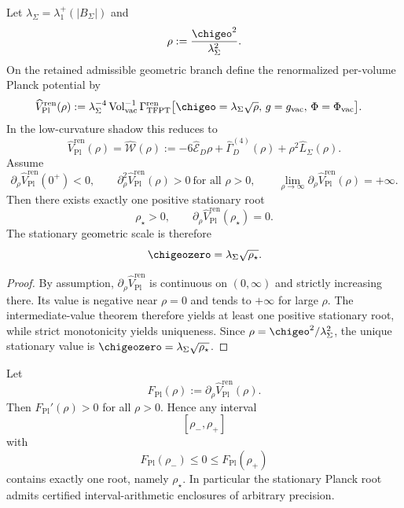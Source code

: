 \begin{theorem}
\label{thm:absolute-spectral-planck-closure}
\label{thm:stationary_geometric_scale_equation}
Let $\lambda_\Sigma=\lambda_1^+(|B_\Sigma|)$ and
\[
\rho:=\frac{\chigeo^2}{\lambda_\Sigma^2}.
\]
On the retained admissible geometric branch define the renormalized per-volume Planck potential by
\[
\begin{aligned}
\widehat V_{\mathrm{Pl}}^{\mathrm{ren}}(\rho)
&:=
\lambda_\Sigma^{-4}\operatorname{Vol}_{\mathrm{vac}}^{-1}
\Gamma_{\mathrm{TFPT}}^{\mathrm{ren}}
\bigl[\chigeo=\lambda_\Sigma\sqrt{\rho},\,g=g_{\mathrm{vac}},\,\Phi=\Phi_{\mathrm{vac}}\bigr].
\end{aligned}
\]
In the low-curvature shadow this reduces to
\[
\widehat V_{\mathrm{Pl}}^{\mathrm{ren}}(\rho)=\widehat{\mathcal W}(\rho)
:=
-6\widehat{\mathcal E}_D\rho
+
\widehat\Gamma_D^{(4)}(\rho)
+
\rho^2\widehat L_\Sigma(\rho).
\]
Assume
\[
\partial_\rho\widehat V_{\mathrm{Pl}}^{\mathrm{ren}}(0^+)<0,
\qquad
\partial_\rho^2\widehat V_{\mathrm{Pl}}^{\mathrm{ren}}(\rho)>0\ \text{for all }\rho>0,
\qquad
\lim_{\rho\to\infty}\partial_\rho\widehat V_{\mathrm{Pl}}^{\mathrm{ren}}(\rho)=+\infty.
\]
Then there exists exactly one positive stationary root
\[
\rho_\star>0,
\qquad
\partial_\rho\widehat V_{\mathrm{Pl}}^{\mathrm{ren}}(\rho_\star)=0.
\]
The stationary geometric scale is therefore
\[
\chigeozero=\lambda_\Sigma\sqrt{\rho_\star}.
\]
\end{theorem}

\begin{proof}
By assumption, $\partial_\rho\widehat V_{\mathrm{Pl}}^{\mathrm{ren}}$ is continuous on $(0,\infty)$
and strictly increasing there. Its value is negative near $\rho=0$ and tends to $+\infty$ for
large $\rho$. The intermediate-value theorem therefore yields at least one positive stationary root,
while strict monotonicity yields uniqueness. Since $\rho=\chigeo^2/\lambda_\Sigma^2$, the unique
stationary value is
$\chigeozero=\lambda_\Sigma\sqrt{\rho_\star}$.
\end{proof}

\begin{corollary}
\label{cor:computable-spectral-planck-root}
Let
\[
F_{\mathrm{Pl}}(\rho):=\partial_\rho\widehat V_{\mathrm{Pl}}^{\mathrm{ren}}(\rho).
\]
Then $F_{\mathrm{Pl}}'(\rho)>0$ for all $\rho>0$. Hence any interval
\[
[\rho_-,\rho_+]
\]
with
\[
F_{\mathrm{Pl}}(\rho_-)\le 0\le F_{\mathrm{Pl}}(\rho_+)
\]
contains exactly one root, namely $\rho_\star$. In particular the stationary Planck root admits
certified interval-arithmetic enclosures of arbitrary precision.
\end{corollary}

